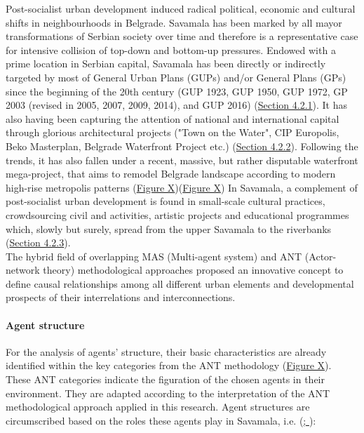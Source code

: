 \documentclass[11pt]{report}
\begin{document}
Post-socialist urban development induced radical political, economic and cultural shifts in neighbourhoods in Belgrade. Savamala has been marked by all mayor transformations of Serbian society over time and therefore is a representative case for intensive collision of top-down and bottom-up pressures.
Endowed with a prime location in Serbian capital, Savamala has been directly or indirectly targeted by most of General Urban Plans (GUPs) and/or General Plans (GPs) since the beginning of the 20th century (GUP 1923, GUP 1950, GUP 1972, GP 2003 (revised in 2005, 2007, 2009, 2014), and GUP 2016) (\href{Section 4.2.1}{Section 4.2.1}).
It has also having been capturing the attention of national and international capital through glorious architectural projects ("Town on the Water", CIP Europolis, Beko Masterplan, Belgrade Waterfront Project etc.) (\href{Section 4.2.2}{Section 4.2.2}).
Following the trends, it has also fallen under a recent, massive, but rather disputable waterfront mega-project, that aims to remodel Belgrade landscape according to modern high-rise metropolis patterns (\href{FigureX}{Figure X})(\href{FigureX}{Figure X})
In Savamala, a complement of post-socialist urban development is found in small-scale cultural practices, crowdsourcing civil and  activities, artistic projects and educational programmes which, slowly but surely, spread from the upper Savamala to the riverbanks (\href{Section 4.2.3}{Section 4.2.3}).
\\

The hybrid field of overlapping MAS (Multi-agent system) and ANT (Actor-network theory) methodological approaches proposed an innovative concept to define causal relationships among all different urban elements and developmental prospects of their interrelations and interconnections.

\paragraph{Agent structure}

For the analysis of agents' structure, their basic characteristics are already identified within the key categories from the ANT methodology (\href{FigureX}{Figure X}).
These ANT categories indicate the figuration of the chosen agents in their environment. They are adapted according to the interpretation of the ANT methodological approach applied in this research.
Agent structures are circumscribed based on the roles these agents play in Savamala, i.e. (\href{Cvetinovic}{\cite{CvetinovicEtAl.2016b}; \cite{CvetinovicEtAl.2016a}}): %
\end{document}
